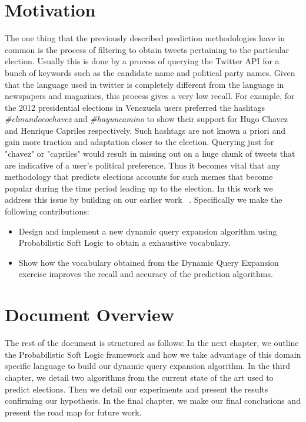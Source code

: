 \section{Motivation}
The one thing that the previously described prediction methodologies have in common is the process of filtering to obtain tweets pertaining to the particular election.
Usually this is done by a process of querying the Twitter API for a bunch of keywords such as the candidate name and political party names.
Given that the language used in twitter is completely different from the language in newspapers and magazines, this process gives a very low recall.
For example, for the 2012 presidential elections in Venezuela users preferred  the hashtags \emph{\#elmundocochavez} and \emph{\#hayuncamino} to show their support for Hugo Chavez and Henrique Capriles respectively.
Such hashtags are not known a priori and gain more traction and adaptation closer to the election.
Querying just for "chavez" or "capriles" would result in missing out on a huge chunk of tweets that are indicative of a user's political preference.
Thus it becomes vital that any methodology that predicts elections accounts for such memes that become popular during the time period leading up to the election.
In this work we address this issue by building on our earlier work ~\cite{huang2012social}.
Specifically we make the following contributions:
\begin{itemize}
\item
Design and implement a new dynamic query expansion algorithm using Probabilistic Soft Logic to obtain a exhaustive vocabulary.
\item
Show how the vocabulary obtained from the Dynamic Query Expansion exercise improves the recall and accuracy of the prediction algorithms.
\end{itemize}
\section{Document Overview}
The rest of the document is structured as follows:
\newline In the next chapter, we outline the Probabilistic Soft Logic framework and how we take advantage of this domain specific language to build our dynamic query expansion algorithm.
\newline In the third chapter, we detail two algorithms from the current state of the art used to predict elections.
\newline Then we detail our experiments and present the results confirming our hypothesis.
\newline In the final chapter, we make our final conclusions and present the road map for future work.
